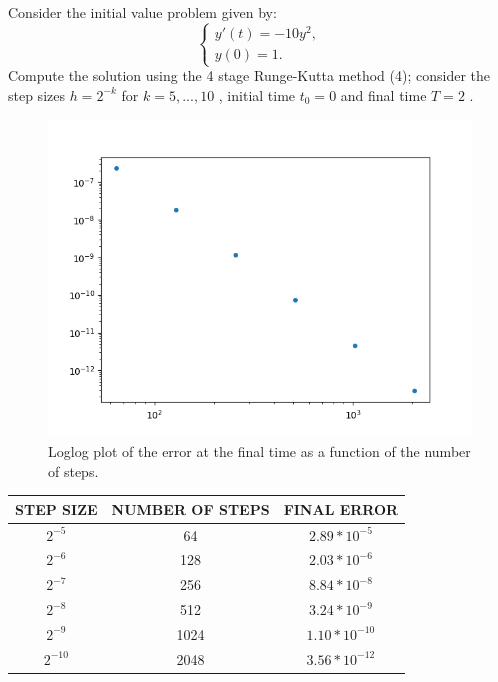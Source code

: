 \documentclass[a4paper,12pt]{article}
\begin{document}
Consider the initial value problem given by:
\begin{equation}
\begin{cases}
y'(t) = -10y^2 , \\
y(0) = 1.
\end{cases}
\end{equation}
Compute the solution using the 4 stage Runge-Kutta method (4); consider the step sizes $h = 2^{-k}$ for $k = 5,...,10$ , initial time $t_0 = 0$ and final time $T = 2$ .


\begin{figure}[H]
\centering
    \includegraphics[width=\textwidth]{rk4_error.png} %
    \caption{Loglog plot of the error at the final time as a function of the number of steps.}
    \label{fig:rk4_error}
\end{figure}


\begin{tabular}{|c|c|c|}
    \hline
    STEP SIZE & NUMBER OF STEPS & FINAL ERROR \\ \hline
    $2^{-5}$ & 64 & $2.89*10^{-5}$  \\ \hline
    $2^{-6}$ & 128 & $2.03*10^{-6}$  \\ \hline
    $2^{-7}$ & 256 & $8.84*10^{-8}$  \\ \hline
    $2^{-8}$ & 512 & $3.24*10^{-9}$  \\ \hline
    $2^{-9}$ & 1024 & $1.10*10^{-10}$ \\ \hline
    $2^{-10}$ & 2048 & $3.56*10^{-12}$  \\ \hline
    \hline
\end{tabular}
\\[5pt]
\end{document}
